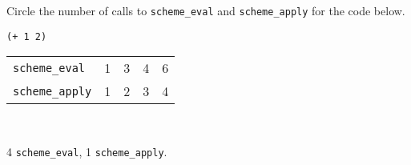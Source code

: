 \begin{blocksection}
\question Circle the number of calls to \lstinline$scheme_eval$ and
\lstinline$scheme_apply$ for the code below.

 \begin{lstlisting}
(+ 1 2)
\end{lstlisting}

\begin{tabular}{lrrrr}
\lstinline$scheme_eval$ & 1 & 3 & 4 & 6 \\
\lstinline$scheme_apply$ & 1 & 2 & 3 & 4
\end{tabular}
\\

\begin{solution}
4 \lstinline$scheme_eval$, 1 \lstinline$scheme_apply$.
\end{solution}

\end{blocksection}
